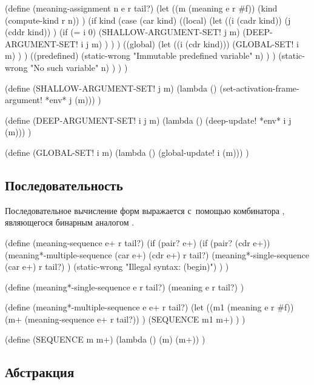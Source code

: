 \begin{code:lisp}
(define (meaning-assignment n e r tail?)
  (let ((m (meaning e r #f))
        (kind (compute-kind r n)) )
    (if kind
        (case (car kind)
          ((local)
           (let ((i (cadr kind))
                 (j (cddr kind)) )
             (if (= i 0)
                 (SHALLOW-ARGUMENT-SET! j m)
                 (DEEP-ARGUMENT-SET! i j m) ) ) )
          ((global)
           (let ((i (cdr kind)))
             (GLOBAL-SET! i m) ) )
          ((predefined)
           (static-wrong "Immutable predefined variable" n) ) )
        (static-wrong "No such variable" n) ) ) )

(define (SHALLOW-ARGUMENT-SET! j m)
  (lambda () (set-activation-frame-argument! *env* j (m))) )

(define (DEEP-ARGUMENT-SET! i j m)
  (lambda () (deep-update! *env* i j (m))) )

(define (GLOBAL-SET! i m)
  (lambda () (global-update! i (m))) )
\end{code:lisp}


\subsection{Последовательность}\label{fast/dilute/ssect:sequence}

Последовательное вычисление форм выражается с~помощью комбинатора ,
являющегося бинарным аналогом .

\begin{code:lisp}
(define (meaning-sequence e+ r tail?)
  (if (pair? e+)
      (if (pair? (cdr e+))
          (meaning*-multiple-sequence (car e+) (cdr e+) r tail?)
          (meaning*-single-sequence (car e+) r tail?) )
      (static-wrong "Illegal syntax: (begin)") ) )

(define (meaning*-single-sequence e r tail?)
  (meaning e r tail?) )

(define (meaning*-multiple-sequence e e+ r tail?)
  (let ((m1 (meaning e r #f))
        (m+ (meaning-sequence e+ r tail?)) )
    (SEQUENCE m1 m+) ) )

(define (SEQUENCE m m+)
  (lambda () (m) (m+)) )
\end{code:lisp}


\subsection{Абстракция}\label{fast/dilute/ssect:abstraction}

